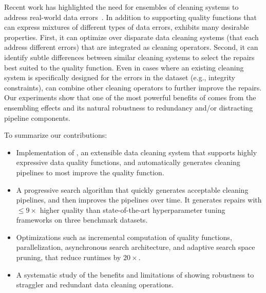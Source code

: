 Recent work has highlighted the need for ensembles of cleaning systems to address real-world data errors~\cite{DBLP:journals/pvldb/AbedjanCDFIOPST16}.  In addition to supporting quality functions that can express mixtures of different types of data errors, \sys exhibits many desirable properties.
First, it can optimize over disparate data cleaning systems (that each address different errors) that are integrated as \sys cleaning operators.  Second, it can identify subtle differences between similar cleaning systems to select the repairs best suited to the quality function.  Even in cases where an existing cleaning system is specifically designed for the errors in the dataset (e.g., integrity constraints), \sys can combine other cleaning operators to further improve the repairs.  Our experiments show that one of the most powerful benefits of \sys comes from the ensembling effects and its natural robustness to redundancy and/or distracting pipeline components.

\smallskip\noindent To summarize our contributions:

\begin{itemize}[leftmargin=*, topsep=0mm, itemsep=0mm]
  \item Implementation of \sys, an extensible data cleaning system that supports highly expressive data quality functions, and automatically generates cleaning pipelines to most improve the quality function.  
  \item A progressive search algorithm that quickly generates acceptable cleaning pipelines, and then improves the pipelines over time.  It generates repairs with $\le 9\times$ higher quality than state-of-the-art hyperparameter tuning frameworks on three benchmark datasets.
  \item Optimizations such as incremental computation of quality functions, parallelization, asynchronous search architecture, and adaptive search space pruning, that reduce runtimes by $20\times$.   
  \item A systematic study of the benefits and limitations of \sys showing robustness to straggler and redundant data cleaning operations.
\end{itemize}



